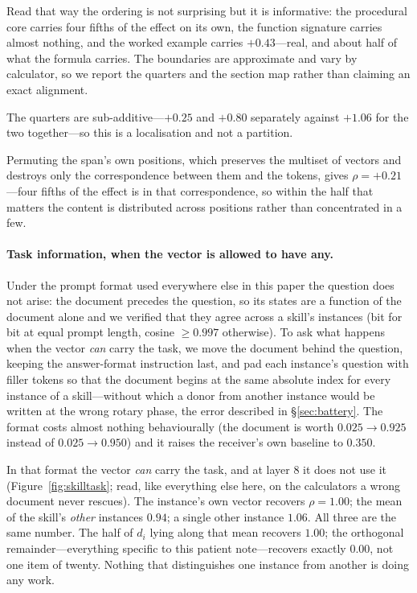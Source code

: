 \documentclass{article}
\newcommand{\dvec}{\ensuremath{d}}
\begin{document}
Read that way the ordering is not surprising but it is informative: the
procedural core carries four fifths of the effect on its own, the function
signature carries almost nothing, and the worked example carries $+0.43$---real,
and about half of what the formula carries. The boundaries are approximate and
vary by calculator, so we report the quarters and the section map rather than
claiming an exact alignment.

The quarters are sub-additive---$+0.25$ and $+0.80$ separately against $+1.06$
for the two together---so this is a localisation and not a partition.

Permuting the span's own positions, which preserves the multiset of vectors and
destroys only the correspondence between them and the tokens, gives
$\rho = +0.21$---four fifths of the effect is in that correspondence, so within
the half that matters the content is distributed across positions rather than
concentrated in a few.



\paragraph{Task information, when the vector is allowed to have any.} Under the
prompt format used everywhere else in this paper the question does not arise:
the document precedes the question, so its states are a function of the document
alone and we verified that they agree across a skill's instances (bit for bit at
equal prompt length, cosine $\ge 0.997$ otherwise).
To ask what happens when the vector \emph{can} carry the task, we move the
document behind the question, keeping the answer-format instruction last, and
pad each instance's question with filler tokens so that the document begins at
the same absolute index for every instance of a skill---without which a donor
from another instance would be written at the wrong rotary phase, the error
described in \S\ref{sec:battery}. The format costs almost nothing behaviourally
(the document is worth $0.025 \to 0.925$ instead of $0.025 \to 0.950$) and it
raises the receiver's own baseline to $0.350$.

In that format the vector \emph{can} carry the task, and at layer 8 it does not
use it (Figure~\ref{fig:skilltask}; read, like everything else here, on the
calculators a wrong document never rescues). The instance's own vector recovers
$\rho = 1.00$; the mean of the skill's \emph{other} instances $0.94$; a single
other instance $1.06$. All three are the same number. The half of $\dvec_i$
lying along that mean recovers $1.00$; the orthogonal remainder---everything
specific to this patient note---recovers exactly $0.00$, not one item of twenty.
Nothing that distinguishes one instance from another is doing any work.
\end{document}
